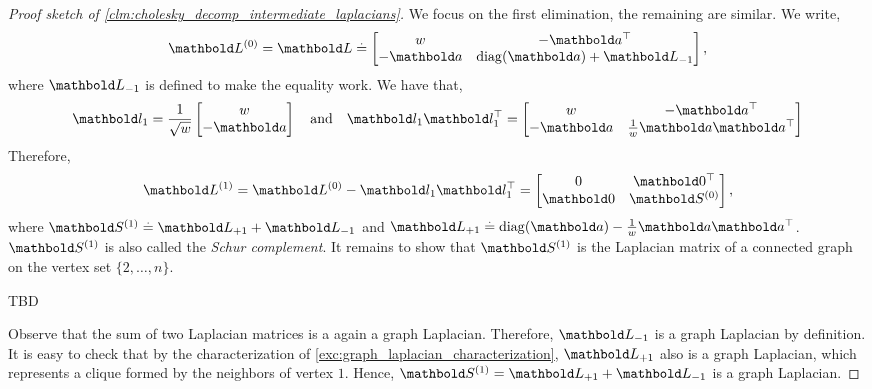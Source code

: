 \begin{proof}[Proof sketch of \cref{clm:cholesky_decomp_intermediate_laplacians}] We focus on the first elimination, the remaining are similar. We write, \begin{align*}
    \mL^{(0)} = \mL \eqdef \begin{bmatrix}
        w & -\trans{\va} \\
        -\va & \diag(\va) + \mL_{-1} \\
    \end{bmatrix},
\end{align*} where $\mL_{-1}$ is defined to make the equality work. We have that, \begin{align*}
    \vl_1 = \frac{1}{\sqrt{w}}\begin{bmatrix}
        w \\
        -\va \\
    \end{bmatrix} \quad\text{and}\quad \vl_1 \trans{\vl_1} = \begin{bmatrix}
        w & -\trans{\va} \\
        -\va & \frac{1}{w}\va\trans{\va} \\
    \end{bmatrix}
\end{align*} Therefore, \begin{align*}
    \mL^{(1)} = \mL^{(0)} - \vl_1 \trans{\vl_1} = \begin{bmatrix}
        0 & \trans{\vZero} \\
        \vZero & \mS^{(0)} \\
    \end{bmatrix},
\end{align*} where $\mS^{(1)} \defeq \mL_{+1} + \mL_{-1}$ and $\mL_{+1} \defeq \diag(\va) - \frac{1}{w}\va\trans{\va}$. $\mS^{(1)}$ is also called the \emph{Schur complement}. It remains to show that $\mS^{(1)}$ is the Laplacian matrix of a connected graph on the vertex set $\{2, \dots, n\}$.

\begin{marginfigure}
TBD
\caption{$\mS^{(1)}$ is the Laplacian matrix of the graph, where the first vertex was removed and all of its neighbors are made to be in a clique.}
\end{marginfigure}

Observe that the sum of two Laplacian matrices is a again a graph Laplacian. Therefore, $\mL_{-1}$ is a graph Laplacian by definition. It is easy to check that by the characterization of \cref{exc:graph_laplacian_characterization}, $\mL_{+1}$ also is a graph Laplacian, which represents a clique formed by the neighbors of vertex $1$. Hence, $\mS^{(1)} = \mL_{+1} + \mL_{-1}$ is a graph Laplacian.


\end{proof}
